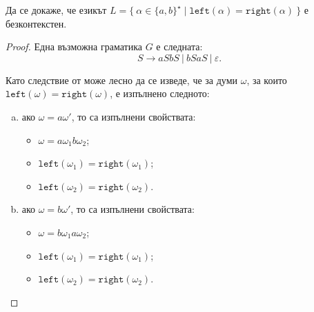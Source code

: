 \begin{framed}
  \begin{problem}
    Да се докаже, че езикът $L = \{\ \alpha \in \{a,b\}^\star\mid \texttt{left}(\alpha) = \texttt{right}(\alpha)\ \}$
    е безконтекстен.
  \end{problem}  
\end{framed}
\begin{proof}
  Една възможна граматика $G$ е следната: 
  \[S \to a  S b S\ |\ b S a S\ |\ \varepsilon.\]
  
  Като следствие от  може лесно да се изведе, че за думи $\omega$, за които $\texttt{left}(\omega) = \texttt{right}(\omega)$,
  е изпълнено следното:
  \begin{enumerate}[a)]
  \item 
    ако $\omega = a\omega'$, то са изпълнени свойствата:
    \begin{itemize}
    \item 
      $\omega = a \omega_1 b \omega_2$;
    \item
      $\texttt{left}(\omega_1) = \texttt{right}(\omega_1)$;
    \item
      $\texttt{left}(\omega_2) = \texttt{right}(\omega_2)$.
    \end{itemize}
  \item
    ако $\omega = b \omega'$, то са изпълнени свойствата:
    \begin{itemize}
    \item 
      $\omega = b \omega_1 a \omega_2$;
    \item
      $\texttt{left}(\omega_1) = \texttt{right}(\omega_1)$;
    \item
      $\texttt{left}(\omega_2) = \texttt{right}(\omega_2)$.
    \end{itemize}
  \end{enumerate}


\end{proof}
